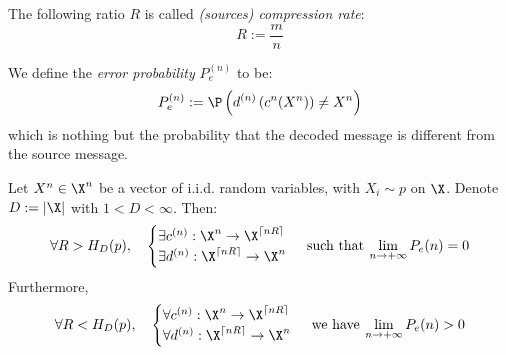 \documentclass[toc]{../cs-classes/cs-classes}
\begin{document}
\begin{definition}
    The following ratio $R$ is called \emph{(sources) compression rate}:
    \begin{equation}
        \label{eq:compression-rate}
        R:=\frac{m}{n}
    \end{equation}
\end{definition}

\begin{definition}
    We define the \emph{error probability} $P_e^{(n)}$ to be:
    \begin{equation}
        P_e^{(n)}:=\P\left(d^{(n)}\left(c^{n}(X^n)\right)\neq X^n\right)
    \end{equation}
    which is nothing but the probability that the decoded message is different from the source message.
\end{definition}

\begin{theorem}
    \label{th:shannon-first}
    Let $X^n\in \X^n$ be a vector of i.i.d. random variables, with $X_i\sim p$ on $\X$. Denote $D:=|\X|$ with $1<D<\infty$. Then:
    \begin{equation}
        \label{eq:shannon-ft-1}
        \forall R>H_D(p), \quad \begin{cases}
            \exists c^{(n)}:\X^n\to \X^{\lceil nR\rceil} \\
            \exists d^{(n)}:\X^{\lceil nR\rceil}\to \X^n
        \end{cases}\: \textnormal{such that}\: \lim_{n\to+\infty}P_e(n)=0
    \end{equation}
    Furthermore,
    \begin{equation}
        \label{eq:shannon-ft-2}
        \forall R<H_D(p), \quad \begin{cases}
            \forall c^{(n)}:\X^n\to \X^{\lceil nR\rceil} \\
            \forall d^{(n)}:\X^{\lceil nR\rceil}\to \X^n
        \end{cases}\: \textnormal{we have}\: \lim_{n\to+\infty}P_e(n)>0
    \end{equation}
\end{theorem}
\end{document}
